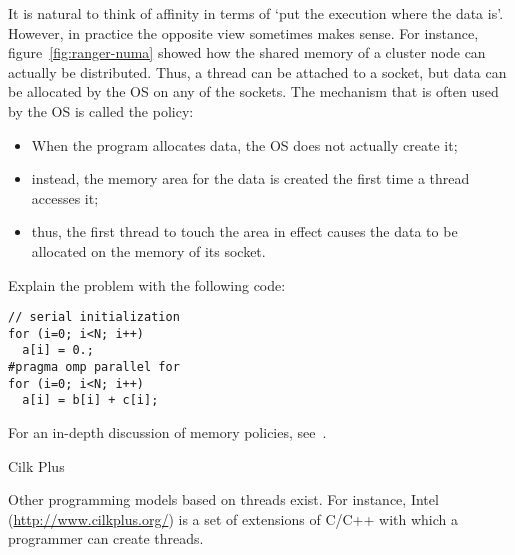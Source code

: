 It is natural to think of affinity in terms of `put the
execution where the data is'. However, in practice the opposite view
sometimes makes sense.  For instance, figure~\ref{fig:ranger-numa}
showed how the shared memory of a cluster node can actually be
distributed. Thus, a thread can be attached to a socket, but data can
be allocated by the \ac{OS} on any of the sockets.  The mechanism that
is often used by the \ac{OS} is called the 
policy:
\begin{itemize}
\item When the program allocates data, the \ac{OS} does not actually
  create it;
\item instead, the memory area for the data is created the first
  time a thread accesses it;
\item thus, the first thread to touch the area in effect causes the
  data to be allocated on the memory of its socket.
\end{itemize}

\begin{exercise}
  Explain the problem with the following code:
\begin{verbatim}
// serial initialization
for (i=0; i<N; i++)
  a[i] = 0.;
#pragma omp parallel for
for (i=0; i<N; i++)
  a[i] = b[i] + c[i];
\end{verbatim}
\end{exercise}

For an in-depth discussion of memory policies, see~\cite{Lameter:NUMAq}.


 {Cilk Plus}

Other programming models based on threads exist. For instance,
Intel  (\url{http://www.cilkplus.org/})
is a set of extensions of C/C++ with which a
programmer can create threads.

